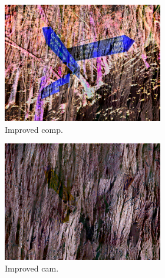 \begin{figure}[]
\begin{subfigure}{\textwidth}
        \begin{subfigure}{0.24\textwidth}
            \centering
            \includegraphics[width=\textwidth]{images/04-experiment02/photo/wood/improved_im.jpg}
            \caption*{Improved comp.}
        \end{subfigure}
        \hfill
        \begin{subfigure}{0.24\textwidth}
            \centering
            \includegraphics[width=\textwidth]{images/04-experiment02/photo/wood/improved_proj.jpg}
            \caption*{Improved cam.}
        \end{subfigure}
        \hfill
        \begin{subfigure}{0.24\textwidth}
            \centering

\end{subfigure}
\end{subfigure}
\end{figure}
